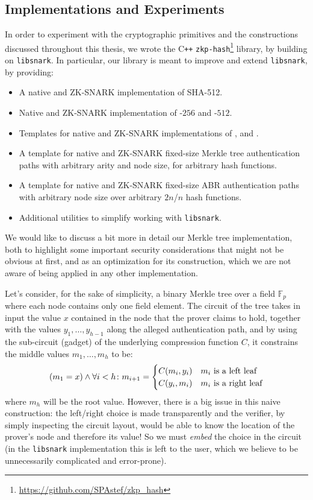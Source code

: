 \subsection{Implementations and Experiments}
In order to experiment with the cryptographic primitives and the constructions discussed 
throughout this thesis, we wrote the C\texttt{++} 
\texttt{zkp-hash}\footnote{\url{https://github.com/SPAstef/zkp_hash}} library, by building on
\texttt{libsnark}.
In particular, our library is meant to improve and extend \texttt{libsnark}, by providing: 
\begin{itemize}
  \item A native and ZK-SNARK implementation of SHA-512.
  \item Native and ZK-SNARK implementation of \Mimchash-\(256\) and \Mimchash-\(512\).
  \item Templates for native and ZK-SNARK implementations of \Poseidon, \Griffin{} 
        and \Arionhash.
  \item A template for native and ZK-SNARK fixed-size Merkle tree authentication paths with 
        arbitrary arity and node size, for arbitrary hash functions.
  \item A template for native and ZK-SNARK fixed-size ABR authentication paths with arbitrary node 
        size over arbitrary \(2n\)/\(n\) hash functions.
  \item Additional utilities to simplify working with \texttt{libsnark}.
\end{itemize}

We would like to discuss a bit more in detail our Merkle tree implementation, both to highlight some 
important security considerations that might not be obvious at first, and as an optimization 
for its construction, which we are not aware of being applied in any other implementation.

Let's consider, for the sake of simplicity, a binary Merkle tree over a field \(\mathbb{F}_p\) 
where each node contains only one field element. 
The circuit of the tree takes in input the value \(x\) contained in the node that the prover claims 
to hold, together with the values \(y_1, \dots, y_{h-1}\) along the alleged authentication path, 
and by using the sub-circuit (gadget) of the underlying compression function \(C\), it constrains 
the middle values \(m_1, \dots, m_h\) to be:
\begin{equation}\label{eq:bad_constraint}
  \Parens*{m_1 = x} \land
  \forall i < h\colon m_{i+1} =
  \begin{cases}
    \call{C}{m_{i}, y_{i}} & \textnormal{\(m_{i}\) is a left leaf} \\
    \call{C}{y_{i}, m_{i}} & \textnormal{\(m_{i}\) is a right leaf}
  \end{cases}
\end{equation}
where \(m_{h}\) will be the root value. 
However, there is a big issue in this naive construction: the left/right choice is made 
transparently and the verifier, by simply inspecting the circuit layout, would be able to know 
the location of the prover's node and therefore its value!
So we must \emph{embed} the choice in the circuit (in the \texttt{libsnark} implementation this is 
left to the user, which we believe to be unnecessarily complicated and error-prone).

